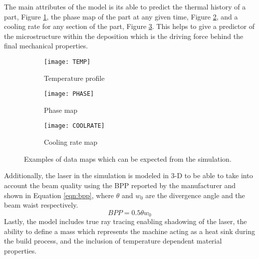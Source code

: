 The main attributes of the model is its able to predict the thermal history of a part, Figure \ref{fig:TEMP}, the phase map of the part at any given time, Figure \ref{fig:PHASE}, and a cooling rate for any section of the part, Figure \ref{fig:COOLRATE}.  This helps to give a predictor of the microstructure within the deposition which is the driving force behind the final mechanical properties. 
\begin{figure}[!htb]\centering
    \begin{subfigure}[c]{0.3\textwidth}
	\centering
	\texttt{[image: TEMP]}
	\caption{Temperature profile}
	\label{fig:TEMP}
    \end{subfigure}
        \begin{subfigure}[c]{0.3\textwidth}
    	\centering
    	\texttt{[image: PHASE]}
    	\caption{Phase map}
    	\label{fig:PHASE}
        \end{subfigure}
            \begin{subfigure}[c]{0.3\textwidth}
            \centering
        	\texttt{[image: COOLRATE]}
        	\caption{Cooling rate map}
        	\label{fig:COOLRATE}
            \end{subfigure}
	\caption{Examples of data maps which can be expected from the simulation.}
	\label{fig:data_maps}	
\end{figure}
Additionally, the laser in the simulation is modeled in 3-D to be able to take into account the beam quality using the \ac{BPP} reported by the manufacturer and shown in Equation \ref{eqn:bpp}, where $\theta$ and $w_0$ are the divergence angle and the beam waist respectively.
\begin{equation}\label{eqn:bpp}
	BPP = 0.5 \theta w_0
\end{equation} 
Lastly, the model includes true ray tracing enabling shadowing of the laser, the ability to define a mass which represents the machine acting as a heat sink during the build process, and the inclusion of temperature dependent material properties.

